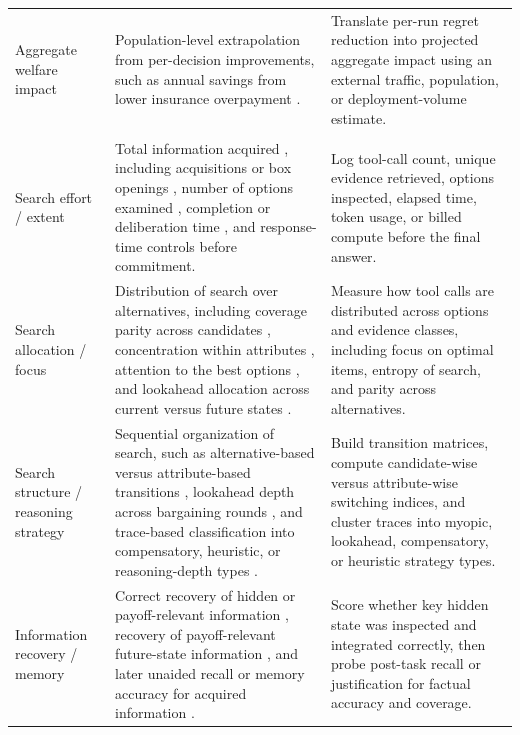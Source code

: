 {\begin{longtable}{@{}p{} p{} p{}@{}}
Aggregate welfare impact & Population-level extrapolation from per-decision improvements, such as annual savings from lower insurance overpayment \citep{johnson2013can,dellaert2024choice}. & Translate per-run regret reduction into projected aggregate impact using an external traffic, population, or deployment-volume estimate. \\
\addlinespace
\multicolumn{3}{@{}l}{\textbf{Search process}} \\
Search effort / extent & Total information acquired \citep{lau2006voters}, including acquisitions or box openings \citep{johnson2002detecting,luce1997choice,payne1988adaptive,dellaert2024choice}, number of options examined \citep{dellaert2024choice}, completion or deliberation time \citep{hodge2004does,johnson2013can,luce1997choice,payne1988adaptive}, and response-time controls \citep{freeman2011looking} before commitment. & Log tool-call count, unique evidence retrieved, options inspected, elapsed time, token usage, or billed compute before the final answer. \\
Search allocation / focus & Distribution of search over alternatives, including coverage parity across candidates \citep{lau2006voters}, concentration within attributes \citep{luce1997choice,payne1988adaptive}, attention to the best options \citep{dellaert2024choice}, and lookahead allocation across current versus future states \citep{johnson2002detecting}. & Measure how tool calls are distributed across options and evidence classes, including focus on optimal items, entropy of search, and parity across alternatives. \\
Search structure / reasoning strategy & Sequential organization of search, such as alternative-based versus attribute-based transitions \citep{luce1997choice,payne1988adaptive,lau2006voters}, lookahead depth across bargaining rounds \citep{johnson2002detecting}, and trace-based classification into compensatory, heuristic, or reasoning-depth types \citep{johnson2002detecting,payne1988adaptive,lau2006voters}. & Build transition matrices, compute candidate-wise versus attribute-wise switching indices, and cluster traces into myopic, lookahead, compensatory, or heuristic strategy types. \\
Information recovery / memory & Correct recovery of hidden or payoff-relevant information \citep{hodge2004does}, recovery of payoff-relevant future-state information \citep{johnson2002detecting}, and later unaided recall or memory accuracy for acquired information \citep{lau2006voters}. & Score whether key hidden state was inspected and integrated correctly, then probe post-task recall or justification for factual accuracy and coverage. \\

\end{longtable}}
